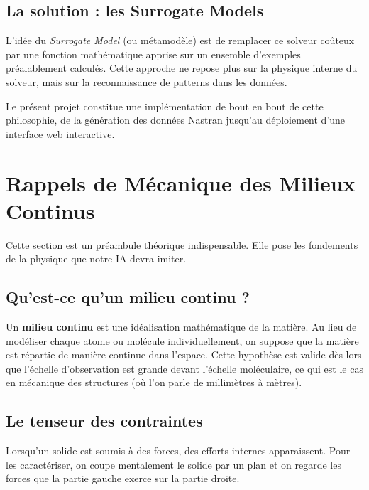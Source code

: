 \documentclass[journal, a4paper, twocolumn]{IEEEtran}
\begin{document}
\subsection{La solution : les Surrogate Models}
L'idée du \textit{Surrogate Model} (ou métamodèle) est de remplacer ce solveur coûteux par une fonction mathématique apprise sur un ensemble d'exemples préalablement calculés. Cette approche ne repose plus sur la physique interne du solveur, mais sur la reconnaissance de patterns dans les données.

Le présent projet constitue une implémentation de bout en bout de cette philosophie, de la génération des données Nastran jusqu'au déploiement d'une interface web interactive.

\section{Rappels de Mécanique des Milieux Continus}
\label{sec:mmc}

Cette section est un préambule théorique indispensable. Elle pose les fondements de la physique que notre IA devra imiter.

\subsection{Qu'est-ce qu'un milieu continu ?}

Un \textbf{milieu continu} est une idéalisation mathématique de la matière. Au lieu de modéliser chaque atome ou molécule individuellement, on suppose que la matière est répartie de manière continue dans l'espace. Cette hypothèse est valide dès lors que l'échelle d'observation est grande devant l'échelle moléculaire, ce qui est le cas en mécanique des structures (où l'on parle de millimètres à mètres).

\subsection{Le tenseur des contraintes}

Lorsqu'un solide est soumis à des forces, des efforts internes apparaissent. Pour les caractériser, on coupe mentalement le solide par un plan et on regarde les forces que la partie gauche exerce sur la partie droite.
\end{document}
